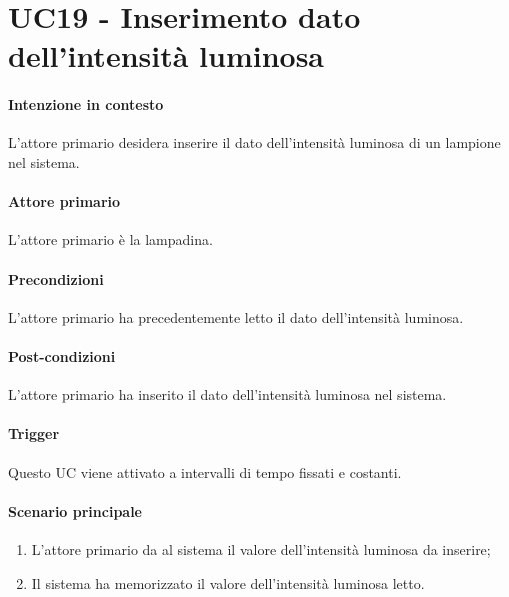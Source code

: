 \section{UC19 - Inserimento dato dell'intensità luminosa}\label{uc:19}
\paragraph{Intenzione in contesto} L'attore primario desidera inserire il dato dell'intensità luminosa di un lampione nel sistema.
\paragraph{Attore primario} L'attore primario è la lampadina.
\paragraph{Precondizioni} L'attore primario ha precedentemente letto il dato dell'intensità luminosa.
\paragraph{Post-condizioni} L'attore primario ha inserito il dato dell'intensità luminosa nel sistema.
\paragraph{Trigger} Questo UC viene attivato a intervalli di tempo fissati e costanti.
\paragraph{Scenario principale}
\begin{enumerate}
    \item L'attore primario da al sistema il valore dell'intensità luminosa da inserire;
    \item Il sistema ha memorizzato il valore dell'intensità luminosa letto.
\end{enumerate}